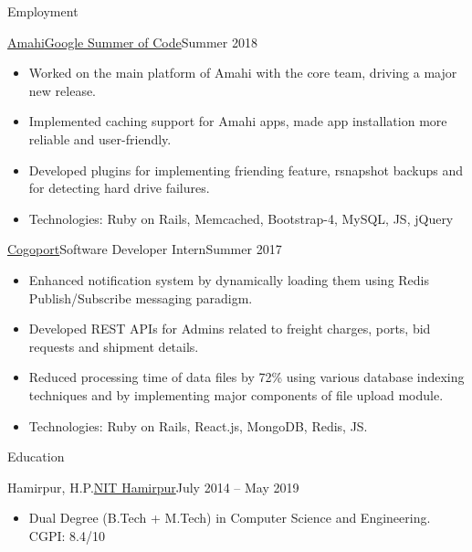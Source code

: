 \documentclass[]{mcdowellcv}
\begin{document}
	\makeheader
	
	\begin{cvsection}{Employment}
		\begin{cvsubsection}{\href {https://summerofcode.withgoogle.com/organizations/4708787353550848/}{Amahi}}{\href {https://summerofcode.withgoogle.com/}{Google Summer of Code}}{Summer 2018}
			\begin{itemize}
				\item Worked on the main platform of Amahi with the core team, driving a major new release.
				\item Implemented caching support for Amahi apps, made app installation more reliable and user-friendly.
				\item Developed plugins for implementing friending feature, rsnapshot backups and for detecting hard drive failures.
				\item Technologies: Ruby on Rails,  Memcached, Bootstrap-4, MySQL, JS, jQuery
			\end{itemize}
		\end{cvsubsection}
		\begin{cvsubsection}{\href {http://www.cogoport.com/}{Cogoport}}{Software Developer Intern}{Summer 2017}			
			\begin{itemize}
				\item Enhanced notification system by dynamically loading them using Redis Publish/Subscribe messaging paradigm.
				\item Developed REST APIs for Admins related to freight charges, ports, bid requests and shipment details. 
				\item Reduced processing time of data files by 72\% using various database indexing techniques and by implementing major components of file upload module.
				\item Technologies: Ruby on Rails, React.js, MongoDB, Redis, JS.
			\end{itemize}
		\end{cvsubsection}
	\end{cvsection}
	
	\begin{cvsection}{Education}
		\begin{cvsubsection}{Hamirpur, H.P.}{\href {http://nith.ac.in/}{NIT Hamirpur}}{July 2014 -- May 2019}
			\begin{itemize}
				\item Dual Degree (B.Tech + M.Tech) in Computer Science and Engineering. CGPI: 8.4/10
			\end{itemize}
		\end{cvsubsection}
	\end{cvsection}
	
\end{document}
